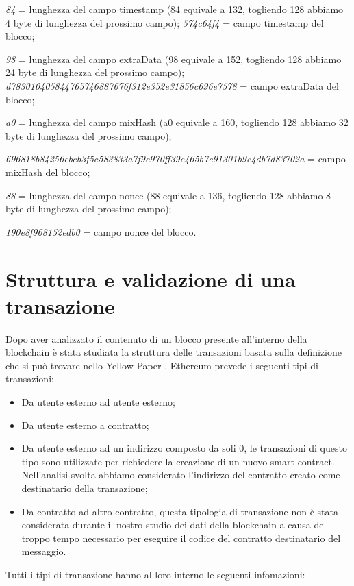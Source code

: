 \documentclass[12pt]{report}
\begin{document}
\textit{84} = lunghezza del campo timestamp (84 equivale a 132, togliendo 128 abbiamo 4 byte di lunghezza del prossimo campo);
\textit{574c64f4} = campo timestamp del blocco;

\textit{98} = lunghezza del campo extraData (98 equivale a 152, togliendo 128 abbiamo 24 byte di lunghezza del prossimo campo);\newline
\textit{d783010405844765746887676f312e352e31856c696e7578} = campo extraData del blocco;

\textit{a0} = lunghezza del campo mixHash (a0 equivale a 160, togliendo 128 abbiamo 32 byte di lunghezza del prossimo campo);

\textit{696818b84256ebcb3f5c583833a7f9c970ff39c465b7e91301b9c4db7d83702a} = campo mixHash del blocco;

\textit{88} = lunghezza del campo nonce (88 equivale a 136, togliendo 128 abbiamo 8 byte di lunghezza del prossimo campo);

\textit{190e8f968152edb0} = campo nonce del blocco.

\newpage
\section{Struttura e validazione di una transazione}

Dopo aver analizzato il contenuto di un blocco presente all'interno della blockchain è stata studiata la struttura delle transazioni basata sulla definizione che si può trovare nello Yellow Paper \cite{YellowPaper}.
Ethereum prevede i seguenti tipi di transazioni:

\begin{itemize}
    \item Da utente esterno ad utente esterno;
    \item Da utente esterno a contratto;
    \item Da utente esterno ad un indirizzo composto da soli 0, le transazioni di questo tipo sono utilizzate per richiedere la creazione di un nuovo smart contract. Nell'analisi svolta abbiamo considerato l'indirizzo del contratto creato come destinatario della transazione;
    \item Da contratto ad altro contratto, questa tipologia di transazione non è stata considerata durante il nostro studio dei dati della blockchain a causa del troppo tempo necessario per eseguire il codice del contratto destinatario del messaggio.
\end{itemize}

Tutti i tipi di transazione hanno al loro interno le seguenti infomazioni:
\end{document}
